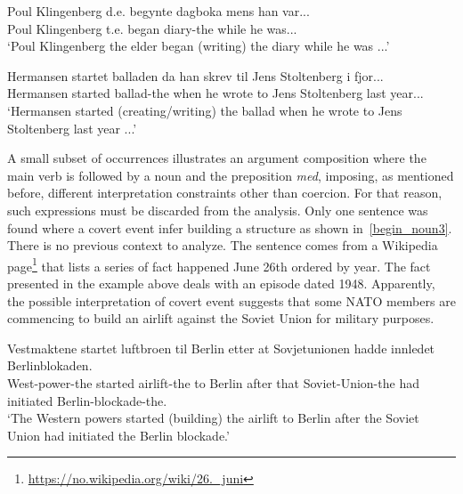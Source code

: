 \documentclass{article}
\begin{document}
        \gll Poul Klingenberg d.e. begynte dagboka mens han var...\\
             Poul Klingenberg t.e. began diary-the while he was...\\
        \glt ‘Poul Klingenberg the elder began (writing) the diary while he was ...’
        \z
        
        \ea \label{starte_noun1} %

        \gll Hermansen startet balladen da han skrev til Jens Stoltenberg i fjor...\\
             Hermansen started ballad-the when he wrote to Jens Stoltenberg last year...\\
        \glt ‘Hermansen started (creating/writing) the ballad when he wrote to Jens Stoltenberg last year ...’
        \z
    
     
 A small subset of occurrences illustrates an argument composition where the main verb is followed by a noun and the preposition \emph{med}, imposing, as mentioned before, different interpretation constraints other than coercion. For that reason, such expressions must be discarded from the analysis. Only one sentence was found where a covert event infer building a structure as shown in~\ref{begin_noun3}. There is no previous context to analyze. The sentence comes from a Wikipedia page\footnote{\url{https://no.wikipedia.org/wiki/26._juni}} that lists a series of fact happened June 26th ordered by year. The fact presented in the example above deals with an episode dated 1948. Apparently, the possible interpretation of covert event suggests that some NATO members are commencing to build an airlift against the Soviet Union for military purposes.
        \ea \label{begin_noun3} %

        \gll Vestmaktene startet luftbroen til Berlin etter at Sovjetunionen hadde innledet Berlinblokaden.\\
             West-power-the started airlift-the to Berlin after that Soviet-Union-the had initiated Berlin-blockade-the.\\
        \glt ‘The Western powers started (building) the airlift to Berlin after the Soviet Union had initiated the Berlin blockade.’
        \z
\end{document}
